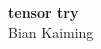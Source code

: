 \documentclass[12pt]{article}
\begin{document}
\begin{center}
	{\huge \textbf{tensor try}}\ \\ {\large Bian Kaiming}
\end{center}
\end{document}
